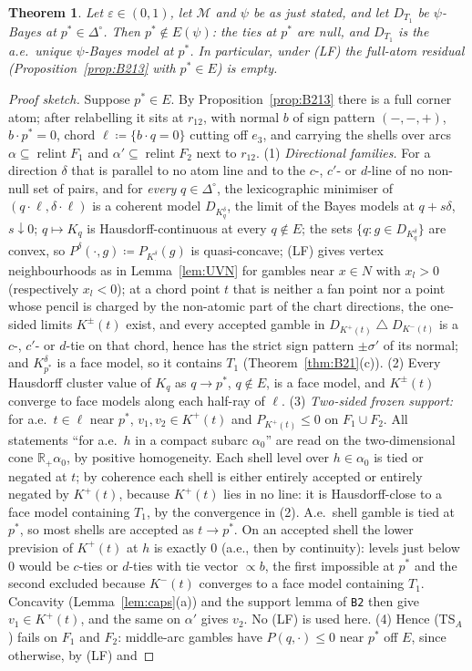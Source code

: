 \documentclass[11pt]{article}
\newtheorem{theorem}{Theorem}[section]
\theoremstyle{definition}
\theoremstyle{remark}
\newcommand{\R}{\mathbb R}
\newcommand{\Di}{\Delta^{\circ}}
\newcommand{\M}{\mathcal M}
\newcommand{\relint}{\operatorname{relint}}
\newcommand{\sd}{\mathbin{\triangle}}
\newcommand{\src}[1]{\texttt{#1}}
\begin{document}
\begin{theorem}\label{thm:D1}
Let $\varepsilon\in(0,1)$, let $\M$ and $\psi$ be as just stated, and let $D_{T_1}$ be $\psi$-Bayes at $p^*\in\Di$. Then $p^*\notin E(\psi)$: the ties at $p^*$ are null, and $D_{T_1}$ is the a.e.\ unique $\psi$-Bayes model at $p^*$. In particular, under (LF) the full-atom residual (Proposition~\ref{prop:B213} with $p^*\in E$) is empty.
\end{theorem}
\begin{proof}[Proof sketch]
Suppose $p^*\in E$. By Proposition~\ref{prop:B213} there is a full corner atom; after relabelling it sits at $r_{12}$, with normal $b$ of sign pattern $(-,-,+)$, $b\cdot p^*=0$, chord $\ell\coloneqq\{b\cdot q=0\}$ cutting off $e_3$, and carrying the shells over arcs $\alpha\subseteq\relint F_1$ and $\alpha'\subseteq\relint F_2$ next to $r_{12}$. (1) \emph{Directional families.} For a direction $\delta$ that is parallel to no atom line and to the $c$-, $c'$- or $d$-line of no non-null set of pairs, and for \emph{every} $q\in\Di$, the lexicographic minimiser of $(q\cdot\ell,\delta\cdot\ell)$ is a coherent model $D_{K^\delta_q}$, the limit of the Bayes models at $q+s\delta$, $s\downarrow0$; $q\mapsto K_q$ is Hausdorff-continuous at every $q\notin E$; the sets $\{q:g\in D_{K^\delta_q}\}$ are convex, so $P^\delta(\cdot,g)\coloneqq P_{K^\delta_\cdot}(g)$ is quasi-concave; (LF) gives vertex neighbourhoods as in Lemma~\ref{lem:UVN} for gambles near $x\in N$ with $x_l>0$ (respectively $x_l<0$); at a chord point $t$ that is neither a fan point nor a point whose pencil is charged by the non-atomic part of the chart directions, the one-sided limits $K^\pm(t)$ exist, and every accepted gamble in $D_{K^+(t)}\sd D_{K^-(t)}$ is a $c$-, $c'$- or $d$-tie on that chord, hence has the strict sign pattern $\pm\sigma'$ of its normal; and $K^\delta_{p^*}$ is a face model, so it contains $T_1$ (Theorem~\ref{thm:B21}(c)). (2) Every Hausdorff cluster value of $K_q$ as $q\to p^*$, $q\notin E$, is a face model, and $K^\pm(t)$ converge to face models along each half-ray of $\ell$. (3) \emph{Two-sided frozen support:} for a.e.\ $t\in\ell$ near $p^*$, $v_1,v_2\in K^+(t)$ and $P_{K^+(t)}\le0$ on $F_1\cup F_2$. All statements ``for a.e.\ $h$ in a compact subarc $\alpha_0$'' are read on the two-dimensional cone $\R_+\alpha_0$, by positive homogeneity. Each shell level over $h\in\alpha_0$ is tied or negated at $t$; by coherence each shell is either entirely accepted or entirely negated by $K^+(t)$, because $K^+(t)$ lies in no line: it is Hausdorff-close to a face model containing $T_1$, by the convergence in (2). A.e.\ shell gamble is tied at $p^*$, so most shells are accepted as $t\to p^*$. On an accepted shell the lower prevision of $K^+(t)$ at $h$ is exactly $0$ (a.e., then by continuity): levels just below $0$ would be $c$-ties or $d$-ties with tie vector $\propto b$, the first impossible at $p^*$ and the second excluded because $K^-(t)$ converges to a face model containing $T_1$. Concavity (Lemma~\ref{lem:caps}(a)) and the support lemma of \src{B2} then give $v_1\in K^+(t)$, and the same on $\alpha'$ gives $v_2$. No (LF) is used here. (4) Hence (TS$_A$) fails on $F_1$ and $F_2$: middle-arc gambles have $P(q,\cdot)\le0$ near $p^*$ off $E$, since otherwise, by (LF) and 
\end{proof}
\end{document}
